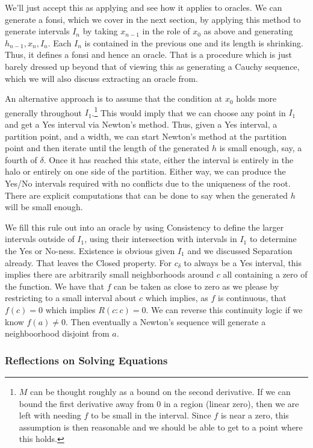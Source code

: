 \documentclass[12pt]{article}
\begin{document}
We'll just accept this as applying and see how it applies to oracles. We can generate a fonsi, which we cover in the next section, by applying this method to generate intervals $I_n$ by taking $x_{n-1}$ in the role of $x_0$ as above and generating $h_{n-1}, x_n, I_n$. Each $I_n$ is contained in the previous one and its length is shrinking. Thus, it defines a fonsi and hence an oracle. That is a procedure which is just barely dressed up beyond that of viewing this as generating a Cauchy sequence, which we will also discuss extracting an oracle from. 

An alternative approach is to assume that the condition at $x_0$ holds more generally throughout $I_1$.\footnote{$M$ can be thought roughly as a bound on the second derivative. If we can bound the first derivative away from 0 in a region (linear zero), then we are left with needing $f$ to be small in the interval. Since $f$ is near a zero, this assumption is then reasonable and we should be able to get to a point where this holds.} This would imply that we can choose any point in $I_1$ and get a Yes interval via Newton's method. Thus, given a Yes interval, a partition point, and a width, we can start Newton's method at the partition point and then iterate until the length of the generated $h$ is small enough, say, a fourth of $\delta$. Once it has reached this state, either the interval is entirely in the halo or entirely on one side of the partition. Either way, we can produce the Yes/No intervals required with no conflicts due to the uniqueness of the root. There are explicit computations that can be done to say when the generated $h$ will be small enough. 

We fill this rule out into an oracle by using Consistency to define the larger intervals outside of $I_1$, using their intersection with intervals in $I_1$ to determine the Yes or No-ness. Existence is obvious given $I_1$ and we discussed Separation already. That leaves the Closed property. For $c_\delta$ to always be a Yes interval, this implies there are arbitrarily small neighborhoods around $c$ all containing a zero of the function. We have that $f$ can be taken as close to zero as we please by restricting to a small interval about $c$ which implies, as $f$ is continuous, that $f(c) = 0$ which implies $R(c:c)=0$. We can reverse this continuity logic if we know $f(a) \neq 0$. Then eventually a Newton's sequence will generate a neighboorhood disjoint from $a$. 



\subsubsection{Reflections on Solving Equations}
\end{document}
